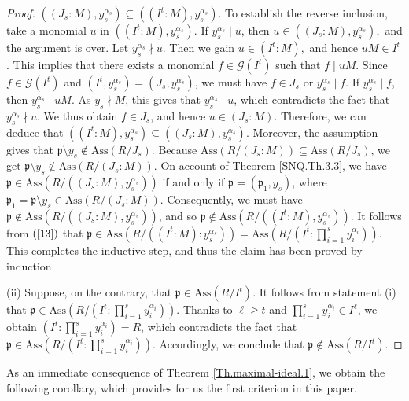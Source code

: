 \documentclass[11pt]{amsart}
\begin{document}
\begin{proof}
$((J_s :M),y_s^{\alpha_s}) \subseteq ((I^t:M),y_s^{\alpha_s}).$ To establish the reverse inclusion, take  a monomial $u$ in 
$((I^t:M),y_s^{\alpha_s})$. If $y_s^{\alpha_s}\mid u$, then $u\in ((J_s :M),y_s^{\alpha_s}),$ and the argument  is over.
 Let  $y_s^{\alpha_s}\nmid u$. Then we gain 
$u\in (I^t:M),$ and hence $uM\in I^t$. This implies  that there exists a monomial $f\in \mathcal{G}(I^t)$ such that $f\mid uM$. 
Since $f\in \mathcal{G}(I^t)$ and $(I^t,y_s^{\alpha_s})=(J_s, y_s^{\alpha_s})$, we must have $f\in J_s$ or $y_s^{\alpha_s} \mid f$. If 
$y_s^{\alpha_s} \mid f$, then $y_s^{\alpha_s} \mid uM$.  As $y_s \nmid M$, this gives that $y_s^{\alpha_s} \mid u$, which contradicts the fact that 
 $y_s^{\alpha_s}\nmid u$.  
We thus obtain  $f\in J_s$, and hence $u\in (J_s :M)$. Therefore, we can deduce that $((I^t:M),y_s^{\alpha_s}) \subseteq ((J_s :M),y_s^{\alpha_s}).$ 
Moreover, the assumption gives  that $\mathfrak{p}\setminus y_s \notin \mathrm{Ass}(R/J_s)$.  Because  $\mathrm{Ass}(R/(J_s:M)) \subseteq \mathrm{Ass}(R/J_s)$, we get  $\mathfrak{p}\setminus y_s \notin \mathrm{Ass}(R/(J_s:M))$. On account of  Theorem \ref{SNQ.Th.3.3}, we have 
$\mathfrak{p}\in \mathrm{Ass}(R/((J_s:M), y_s^{\alpha_s}))$ if and only if $\mathfrak{p}=(\mathfrak{p}_1, y_s)$, 
where $\mathfrak{p}_1 = \mathfrak{p}\setminus  y_s\in \mathrm{Ass}(R/(J_s:M))$. Consequently,   we must have 
$\mathfrak{p}\notin \mathrm{Ass}(R/((J_s:M), y_s^{\alpha_s}))$, and so $\mathfrak{p}\notin\mathrm{Ass}(R/((I^t:M), y_s^{\alpha_s})).$ 
It follows from $(\ref{13})$ that  $\mathfrak{p}\in \mathrm{Ass}(R/((I^t:M): y_s^{\alpha_s}))=\mathrm{Ass}(R/(I^t:\prod_{i=1}^sy_i^{\alpha_i}))$. 
This completes the inductive step, and thus the claim has been proved by induction. 

(ii) Suppose, on the contrary, that  $\mathfrak{p}\in \mathrm{Ass}(R/I^t)$.  It follows from  statement (i) that  
 $\mathfrak{p}\in \mathrm{Ass}(R/(I^t: \prod_{i=1}^{s}y_i^{\alpha_i})).$ Thanks to $\ell \geq t$ and $\prod_{i=1}^{s}y_i^{\alpha_i}\in I^\ell$, 
 we  obtain $(I^t: \prod_{i=1}^{s}y_i^{\alpha_i})=R$, which contradicts the fact that
  $\mathfrak{p}\in \mathrm{Ass}(R/(I^t: \prod_{i=1}^{s}y_i^{\alpha_i})).$ Accordingly, we conclude that   
  $\mathfrak{p}\notin \mathrm{Ass}(R/I^t)$.  
\end{proof}



As an immediate consequence of  Theorem  \ref{Th.maximal-ideal.1}, we obtain   the following corollary, which provides for us the first criterion in this paper. 
\end{document}
